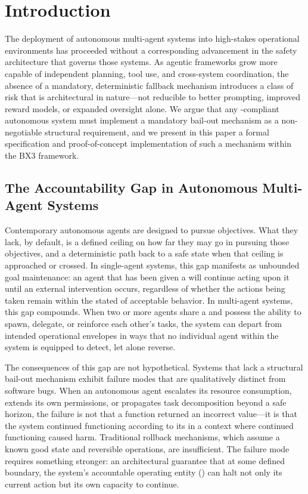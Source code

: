 \section{Introduction}

The deployment of autonomous multi-agent systems into high-stakes operational environments has proceeded without a corresponding advancement in the safety architecture that governs those systems. As agentic frameworks grow more capable of independent planning, tool use, and cross-system coordination, the absence of a mandatory, deterministic fallback mechanism introduces a class of risk that is architectural in nature—not reducible to better prompting, improved reward models, or expanded oversight alone. We argue that any \bxthree-compliant autonomous system must implement a mandatory bail-out mechanism as a non-negotiable structural requirement, and we present in this paper a formal specification and proof-of-concept implementation of such a mechanism within the BX3 framework.

\subsection{The Accountability Gap in Autonomous Multi-Agent Systems}

Contemporary autonomous agents are designed to pursue objectives. What they lack, by default, is a defined ceiling on how far they may go in pursuing those objectives, and a deterministic path back to a safe state when that ceiling is approached or crossed. In single-agent systems, this gap manifests as unbounded goal maintenance: an agent that has been given a \purpose will continue acting upon it until an external intervention occurs, regardless of whether the actions being taken remain within the stated \bounds of acceptable behavior. In multi-agent systems, this gap compounds. When two or more agents share a \purpose and possess the ability to spawn, delegate, or reinforce each other's tasks, the system can depart from intended operational envelopes in ways that no individual agent within the system is equipped to detect, let alone reverse.

The consequences of this gap are not hypothetical. Systems that lack a structural bail-out mechanism exhibit failure modes that are qualitatively distinct from software bugs. When an autonomous agent escalates its resource consumption, extends its own permissions, or propagates task decomposition beyond a safe horizon, the failure is not that a function returned an incorrect value—it is that the system continued functioning according to its \purpose in a context where continued functioning caused harm. Traditional rollback mechanisms, which assume a known good state and reversible operations, are insufficient. The failure mode requires something stronger: an architectural guarantee that at some defined boundary, the system's accountable operating entity (\bxthree) can halt not only its current action but its own capacity to continue.

